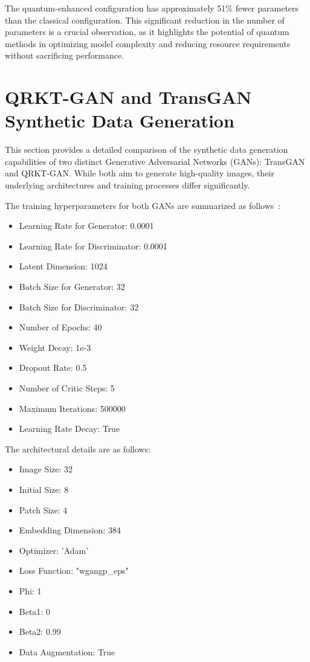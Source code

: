 \documentclass[12pt,a4paper]{report}
\begin{document}
The quantum-enhanced configuration has approximately 51\% fewer parameters than the classical configuration. This significant reduction in the number of parameters is a crucial observation, as it highlights the potential of quantum methods in optimizing model complexity and reducing resource requirements without sacrificing performance.

\clearpage

\section{QRKT-GAN and TransGAN Synthetic Data Generation}

This section provides a detailed comparison of the synthetic data generation capabilities of two distinct Generative Adversarial Networks (GANs): TransGAN and QRKT-GAN. While both aim to generate high-quality images, their underlying architectures and training processes differ significantly.

The training hyperparameters for both GANs are summarized as follows~\cite{ahmet_sarigun_2024_10806360}:

\begin{itemize}
  \item Learning Rate for Generator: 0.0001
  \item Learning Rate for Discriminator: 0.0001
  \item Latent Dimension: 1024
  \item Batch Size for Generator: 32
  \item Batch Size for Discriminator: 32
  \item Number of Epochs: 40
  \item Weight Decay: 1e-3
  \item Dropout Rate: 0.5
  \item Number of Critic Steps: 5
  \item Maximum Iterations: 500000
  \item Learning Rate Decay: True
\end{itemize}

The architectural details are as follows:

\begin{itemize}
  \item Image Size: 32
  \item Initial Size: 8
  \item Patch Size: 4
  \item Embedding Dimension: 384
  \item Optimizer: 'Adam'
  \item Loss Function: "wgangp\_eps"
  \item Phi: 1
  \item Beta1: 0
  \item Beta2: 0.99
  \item Data Augmentation: True
\end{itemize}
\end{document}
